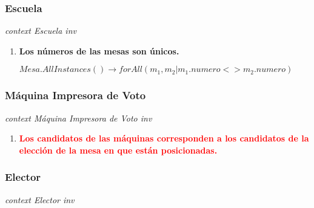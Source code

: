 \subsubsection*{Escuela}

\textit{context Escuela
inv}

\begin{enumerate}
\item \textbf{Los n\'umeros de las mesas son únicos.}

$Mesa.AllInstances() \rightarrow forAll(m_1, m_2|m_1.numero<>m_2.numero)$

\end{enumerate}

\subsubsection*{M\'aquina Impresora de Voto}

\textit{context M\'aquina Impresora de Voto
inv}

\begin{enumerate}
\item \textbf{\textcolor{red}{Los candidatos de las m\'aquinas corresponden a los candidatos de la elecci\'on de la mesa en que est\'an posicionadas.}}

\end{enumerate}

\subsubsection*{Elector}

\textit{context Elector
inv}

